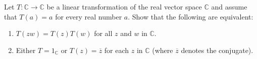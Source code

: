 \begin{multicols}{2}
\columnbreak 

\begin{ex}
Let $T : \mathbb{C} \to \mathbb{C}$ be a linear transformation of the real vector space $\mathbb{C}$ and assume that $T(a) = a$ for every real number $a$. Show that the following are equivalent:


\begin{enumerate}[label={\alph*.}]
\item $T(zw) = T(z)T(w)$ for all $z$ and $w$ in $\mathbb{C}$.

\item Either $T = 1_{\mathbb{C}}$ or $T(z) = \overline{z}$ for each $z$ in $\mathbb{C}$  (where $\overline{z}$ denotes the conjugate).

\end{enumerate}
\end{ex}
\end{multicols}
